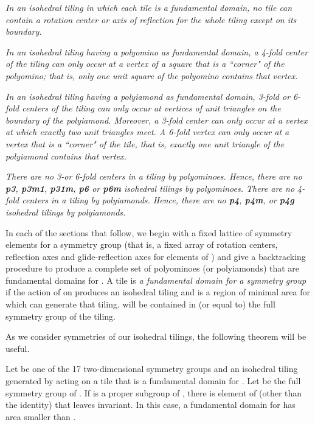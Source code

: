 \documentclass{ws-ijcga}
\begin{document}
\begin{romanlist}
\item 
{\it In an isohedral tiling in which each tile is a fundamental domain, no tile can contain a
rotation center or axis of reflection for the whole tiling except on its boundary.}
\item 
{\it In an isohedral tiling having a polyomino as fundamental domain, a 4-fold center of the tiling
can only occur at a vertex of a square that is a ``corner" of the polyomino; 
that is, only one unit square of the polyomino contains that vertex.}
\item
{\it In an isohedral tiling having a polyiamond as fundamental domain, 3-fold or 6-fold centers of
the tiling can only occur at vertices of unit triangles on the boundary of the polyiamond.
Moreover, a 3-fold center can only occur at a vertex at which exactly two unit triangles meet. A
6-fold vertex can only occur at a vertex that is a ``corner" of the tile, that is, exactly one unit
triangle of the polyiamond contains that vertex.}
\item
{\it There are no 3-or 6-fold centers in a tiling by polyominoes. 
Hence, there are no \mbox{\bf p3}, \mbox{\bf p3m1},
\mbox{\bf p31m}, \mbox{\bf p6} or \mbox{\bf p6m} isohedral tilings by polyominoes. 
There are no 4-fold centers in a tiling by
polyiamonds. Hence, there are no \mbox{\bf p4}, \mbox{\bf p4m}, or \mbox{\bf p4g} isohedral tilings by polyiamonds. }
\end{romanlist}

In each of the sections that follow, we begin with a fixed lattice of symmetry elements for a
symmetry group  (that is, a fixed array of rotation centers, reflection axes and glide-reflection
axes for elements of ) and give a backtracking procedure to produce a complete set of
polyominoes (or polyiamonds) that are fundamental domains for . 
A tile  is {\it a fundamental domain for a symmetry group } 
if the action of  on  produces an isohedral tiling and  is a
region of minimal area for which  can generate that tiling.  will be contained in (or equal to)
the full symmetry group of the tiling.

As we consider symmetries of our isohedral tilings, the following theorem will be useful. \cite{fukuda2011}

\begin{theorem}
\label{th1}
Let  be one of the 17 two-dimensional symmetry groups and  an isohedral tiling
generated by  acting on a tile  that is a fundamental domain for . 
Let  be the full
symmetry group of . 
If  is a proper subgroup of , there is element of  (other than the
identity) that leaves  invariant. In this case, a fundamental domain for  has area smaller
than .
\end{theorem}
\end{document}
